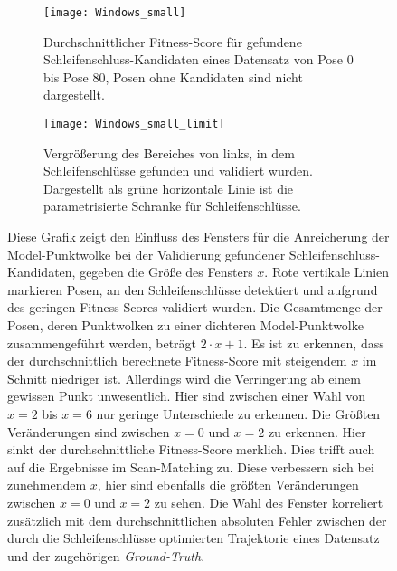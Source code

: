 \begin{figure}
	\centering
	\begin{subfigure}{.5\textwidth}
		 \centering
  		 \texttt{[image: Windows\_small]}
  		 \centering \caption{Durchschnittlicher Fitness-Score für gefundene Schleifenschluss-Kandidaten eines Datensatz von Pose $0$ bis Pose $80$, Posen ohne Kandidaten sind nicht dargestellt.}
  		 \label{fig:single_tsdf}
	\end{subfigure}%
	\begin{subfigure}{.5\textwidth}
    	\centering
  		\texttt{[image: Windows\_small\_limit]}
  		\centering \caption{Vergrößerung des Bereiches von links, in dem Schleifenschlüsse gefunden und validiert wurden. Dargestellt als grüne horizontale Linie ist die parametrisierte Schranke für Schleifenschlüsse.}
  		\label{fig:approx_cloud}
	\end{subfigure}
	\caption{Diese Grafik zeigt den Einfluss des Fensters für die Anreicherung der Model-Punktwolke bei der Validierung gefundener Schleifenschluss-Kandidaten, gegeben die Größe des Fensters $x$. Rote vertikale Linien markieren Posen, an den Schleifenschlüsse detektiert und aufgrund des geringen Fitness-Scores validiert wurden. Die Gesamtmenge der Posen, deren Punktwolken zu einer dichteren Model-Punktwolke zusammengeführt werden, beträgt $2 \cdot x + 1$. Es ist zu erkennen, dass der durchschnittlich berechnete Fitness-Score mit steigendem $x$ im Schnitt niedriger ist. Allerdings wird die Verringerung ab einem gewissen Punkt unwesentlich. Hier sind zwischen einer Wahl von $x = 2$ bis $x = 6$ nur geringe Unterschiede zu erkennen. Die Größten Veränderungen sind zwischen $x = 0$ und $x = 2$ zu erkennen. Hier sinkt der durchschnittliche Fitness-Score merklich. Dies trifft auch auf die Ergebnisse im Scan-Matching zu. Diese verbessern sich bei zunehmendem $x$, hier sind ebenfalls die größten Veränderungen zwischen $x=0$ und $x=2$ zu sehen. Die Wahl des Fenster korreliert zusätzlich mit dem durchschnittlichen absoluten Fehler zwischen der durch die Schleifenschlüsse optimierten Trajektorie eines Datensatz und der zugehörigen \emph{Ground-Truth}.}
	\label{fig:Windows}
\end{figure}

